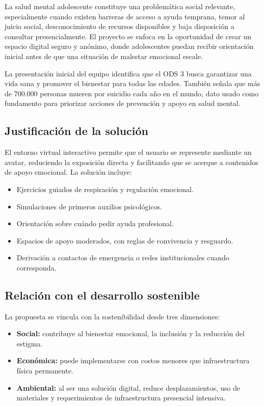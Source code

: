 \documentclass[12pt,letterpaper]{article}
\begin{document}
La salud mental adolescente constituye una problemática social relevante, especialmente cuando existen barreras de acceso a ayuda temprana, temor al juicio social, desconocimiento de recursos disponibles y baja disposición a consultar presencialmente. El proyecto se enfoca en la oportunidad de crear un espacio digital seguro y anónimo, donde adolescentes puedan recibir orientación inicial antes de que una situación de malestar emocional escale.

La presentación inicial del equipo identifica que el ODS 3 busca garantizar una vida sana y promover el bienestar para todas las edades. También señala que más de 700.000 personas mueren por suicidio cada año en el mundo, dato usado como fundamento para priorizar acciones de prevención y apoyo en salud mental.

\subsection{Justificación de la solución}
El entorno virtual interactivo permite que el usuario se represente mediante un avatar, reduciendo la exposición directa y facilitando que se acerque a contenidos de apoyo emocional. La solución incluye:

\begin{itemize}[leftmargin=*]
    \item Ejercicios guiados de respiración y regulación emocional.
    \item Simulaciones de primeros auxilios psicológicos.
    \item Orientación sobre cuándo pedir ayuda profesional.
    \item Espacios de apoyo moderados, con reglas de convivencia y resguardo.
    \item Derivación a contactos de emergencia o redes institucionales cuando corresponda.
\end{itemize}

\subsection{Relación con el desarrollo sostenible}
La propuesta se vincula con la sostenibilidad desde tres dimensiones:

\begin{itemize}[leftmargin=*]
    \item \textbf{Social:} contribuye al bienestar emocional, la inclusión y la reducción del estigma.
    \item \textbf{Económica:} puede implementarse con costos menores que infraestructura física permanente.
    \item \textbf{Ambiental:} al ser una solución digital, reduce desplazamientos, uso de materiales y requerimientos de infraestructura presencial intensiva.
\end{itemize}
\end{document}
